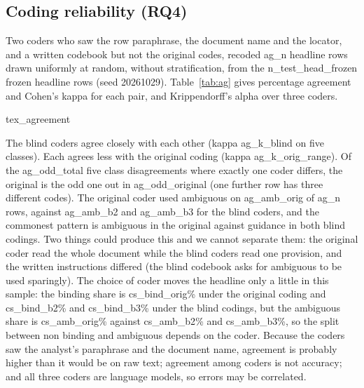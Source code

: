 \documentclass[conference]{IEEEtran}
\begin{document}
\subsection{Coding reliability (RQ4)}
Two coders who saw the row paraphrase, the document name and the locator, and a written codebook but not the original codes, recoded {{ag_n}} headline rows drawn uniformly at random, without stratification, from the {{n_test_head_frozen}} frozen headline rows (seed 20261029). Table~\ref{tab:ag} gives percentage agreement and Cohen's kappa for each pair, and Krippendorff's alpha over three coders.

\begin{table}[t]\centering\small
{{tex_agreement}}
\caption{Agreement (percent / kappa) between the original coding and two blind coders (B2, B3), and alpha over the three.}\label{tab:ag}
\end{table}

The blind coders agree closely with each other (kappa {{ag_k_blind}} on five classes). Each agrees less with the original coding (kappa {{ag_k_orig_range}}). Of the {{ag_odd_total}} five class disagreements where exactly one coder differs, the original is the odd one out in {{ag_odd_original}} (one further row has three different codes). The original coder used ambiguous on {{ag_amb_orig}} of {{ag_n}} rows, against {{ag_amb_b2}} and {{ag_amb_b3}} for the blind coders, and the commonest pattern is ambiguous in the original against guidance in both blind codings. Two things could produce this and we cannot separate them: the original coder read the whole document while the blind coders read one provision, and the written instructions differed (the blind codebook asks for ambiguous to be used sparingly). The choice of coder moves the headline only a little in this sample: the binding share is {{cs_bind_orig}}\% under the original coding and {{cs_bind_b2}}\% and {{cs_bind_b3}}\% under the blind codings, but the ambiguous share is {{cs_amb_orig}}\% against {{cs_amb_b2}}\% and {{cs_amb_b3}}\%, so the split between non binding and ambiguous depends on the coder. Because the coders saw the analyst's paraphrase and the document name, agreement is probably higher than it would be on raw text; agreement among coders is not accuracy; and all three coders are language models, so errors may be correlated. 
\end{document}
